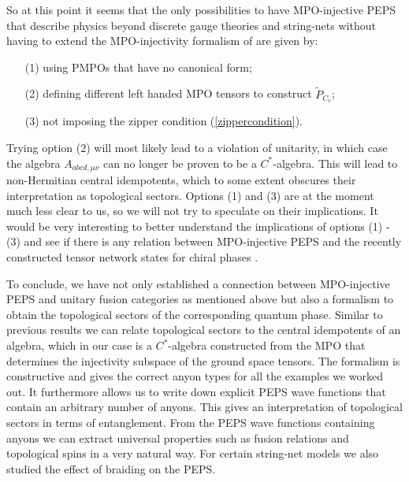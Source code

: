 \documentclass[12 pt]{article}
\begin{document}
So at this point it seems that the only possibilities to have MPO-injective PEPS that describe physics beyond discrete gauge theories and string-nets without having to extend the MPO-injectivity formalism of \cite{MPOpaper} are given by:
\begin{itemize}
\item[(1)] using PMPOs that have no canonical form;
\item[(2)] defining different left handed MPO tensors to construct $\tilde{P}_{C_v}$;
\item[(3)] not imposing the zipper condition (\ref{zippercondition}).
\end{itemize}
Trying option (2) will most likely lead to a violation of unitarity, in which case the algebra $A_{abcd,\mu\nu}$ can no longer be proven to be a $C^*$-algebra. This will lead to non-Hermitian central idempotents, which to some extent obscures their interpretation as topological sectors. Options (1) and (3) are at the moment much less clear to us, so we will not try to speculate on their implications. It would be very interesting to better understand the implications of options (1) - (3) and see if there is any relation between MPO-injective PEPS and the recently constructed tensor network states for chiral phases \cite{chiral1,chiral2}.

To conclude, we have not only established a connection between MPO-injective PEPS and unitary fusion categories as mentioned above but also a formalism to obtain the topological sectors of the corresponding quantum phase. Similar to previous results \cite{Qalgebra,haah} we can relate topological sectors to the central idempotents of an algebra, which in our case is a $C^*$-algebra constructed from the MPO that determines the injectivity subspace of the ground space tensors. The formalism is constructive and gives the correct anyon types for all the examples we worked out. It furthermore allows us to write down explicit PEPS wave functions that contain an arbitrary number of anyons. This gives an interpretation of topological sectors in terms of entanglement. From the PEPS wave functions containing anyons we can extract universal properties such as fusion relations and topological spins in a very natural way. For certain string-net models we also studied the effect of braiding on the PEPS. 
\end{document}
